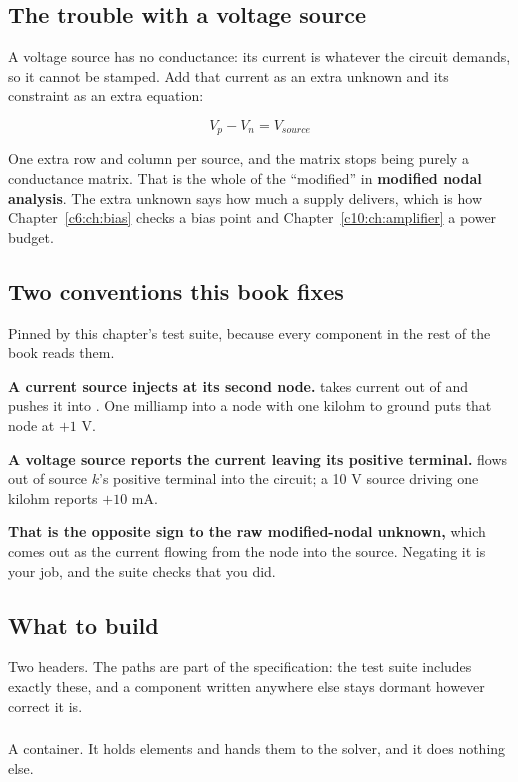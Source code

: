 \subsection{The trouble with a voltage source}
\label{c1:sec:b3}
A voltage source has no conductance: its current is whatever the circuit demands, so it cannot be stamped. Add that current as an extra unknown and its constraint as an extra equation:

\[
  V_p - V_n = V_{source}
\]

One extra row and column per source, and the matrix stops being purely a conductance matrix. That is the whole of the ``modified'' in \textbf{modified nodal analysis}. The extra unknown says how much a supply delivers, which is how Chapter~\ref{c6:ch:bias} checks a bias point and Chapter~\ref{c10:ch:amplifier} a power budget.

\subsection{Two conventions this book fixes}
\label{c1:sec:b4}
Pinned by this chapter's test suite, because every component in the rest of the book reads them.

\textbf{A current source injects at its second node.}  takes current out of  and pushes it into . One milliamp into a node with one kilohm to ground puts that node at $+1$ V.

\textbf{A voltage source reports the current leaving its positive terminal.}  flows out of source $k$'s positive terminal into the circuit; a 10 V source driving one kilohm reports $+10$ mA.

\textbf{That is the opposite sign to the raw modified-nodal unknown,} which comes out as the current flowing from the node into the source. Negating it is your job, and the suite checks that you did.

\subsection{What to build}
\label{c1:sec:b5}
Two headers. The paths are part of the specification: the test suite includes exactly these, and a component written anywhere else stays dormant however correct it is.

\subsubsection{}
A container. It holds elements and hands them to the solver, and it does nothing else.

